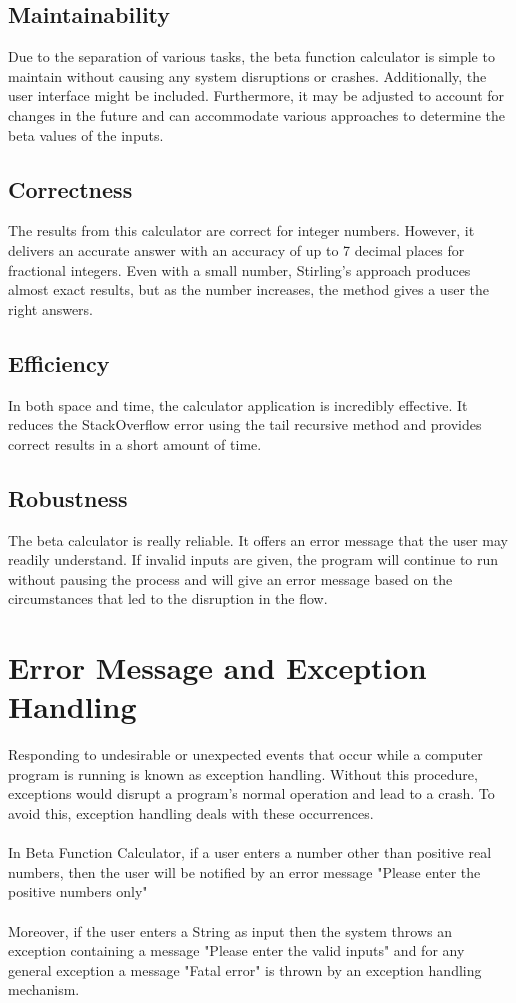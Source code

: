 \documentclass[a4paper, 12pt]{article}
\begin{document}
\subsection*{Maintainability}
Due to the separation of various tasks, the beta function calculator is simple to maintain without causing any system disruptions or crashes. Additionally, the user interface might be included. Furthermore, it may be adjusted to account for changes in the future and can accommodate various approaches to determine the beta values of the inputs.
\subsection*{Correctness}
The results from this calculator are correct for integer numbers. However, it delivers an accurate answer with an accuracy of up to 7 decimal places for fractional integers. Even with a small number, Stirling's approach produces almost exact results, but as the number increases, the method gives a user the right answers.
\subsection*{Efficiency}
In both space and time, the calculator application is incredibly effective. It reduces the StackOverflow error using the tail recursive method and provides correct results in a short amount of time.
\subsection*{Robustness}
The beta calculator is really reliable. It offers an error message that the user may readily understand. If invalid inputs are given, the program will continue to run without pausing the process and will give an error message based on the circumstances that led to the disruption in the flow.

\newpage
\section*{Error Message and Exception Handling}
Responding to undesirable or unexpected events that occur while a computer program is running is known as exception handling. Without this procedure, exceptions would disrupt a program's normal operation and lead to a crash. To avoid this, exception handling deals with these occurrences.\\\\
In Beta Function Calculator, if a user enters a number other than positive real numbers, then the user will be notified by an error message "Please enter the positive numbers only"\\\\
Moreover, if the user enters a String as input then the system throws an exception containing a message "Please enter the valid inputs" and for any general exception a message "Fatal error" is thrown by an exception handling mechanism.
\end{document}
